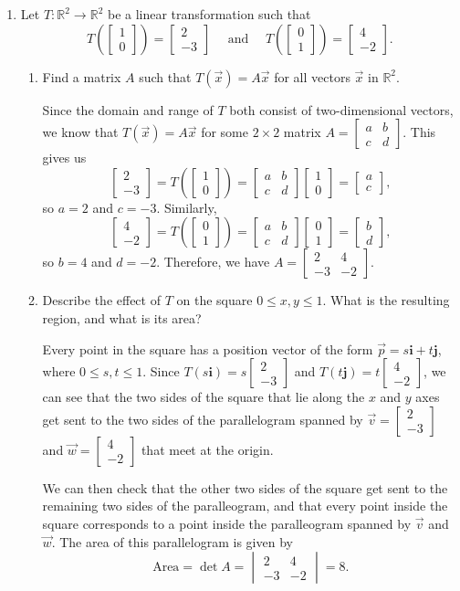 \documentclass[12pt]{article}
\renewcommand{\i}{\mathbf{i}}
\renewcommand{\j}{\mathbf{j}}
\newcommand{\R}{\mathbb{R}}
\newcommand{\bbm}{\begin{bmatrix}}
\newcommand{\ebm}{\end{bmatrix}}
\newcommand{\bvm}{\begin{vmatrix}}
\newcommand{\evm}{\end{vmatrix}}
\begin{document}
\begin{enumerate}
\item Let $T:\R^2\to \R^2$ be a linear transformation such that
\[
 T\left(\bbm 1\\0\ebm\right) = \bbm 2\\-3\ebm \quad\text{ and } \quad T\left(\bbm 0\\1\ebm\right) = \bbm 4\\-2\ebm.
\]
\begin{enumerate}
 \item Find a matrix $A$ such that $T(\vec{x}) = A\vec{x}$ for all vectors $\vec{x}$ in $\R^2$.

\bigskip

Since the domain and range of $T$ both consist of two-dimensional vectors, we know that $T(\vec{x})=A\vec{x}$ for some $2\times 2$ matrix $A=\bbm a&b\\c&d\ebm$. This gives us
\[
 \bbm 2\\-3\ebm = T\left(\bbm 1\\0\ebm\right) = \bbm a&b\\c&d\ebm\bbm 1\\0\ebm = \bbm a\\c\ebm,
\]
so $a=2$ and $c=-3$. Similarly,
\[
 \bbm 4\\-2\ebm = T\left(\bbm 0\\1\ebm\right) = \bbm a&b\\c&d\ebm\bbm 0\\1\ebm = \bbm b\\d\ebm,
\]
so $b=4$ and $d=-2$. Therefore, we have $A=\bbm 2&4\\-3&-2\ebm$.

 \item Describe the effect of $T$ on the square $0\leq x, y\leq 1$. What is the resulting region, and what is its area?

\bigskip

Every point in the square has a position vector of the form $\vec{p}=s\i+t\j$, where $0\leq s,t\leq 1$. Since $T(s\i) = s\bbm 2\\-3\ebm$ and $T(t\j) = t\bbm 4\\-2\ebm$, we can see that the two sides of the square that lie along the $x$ and $y$ axes get sent to the two sides of the parallelogram spanned by $\vec{v} = \bbm 2\\-3\ebm$ and $\vec{w} = \bbm 4\\-2\ebm$ that meet at the origin.

We can then check that the other two sides of the square get sent to the remaining two sides of the paralleogram, and that every point inside the square corresponds to a point inside the paralleogram spanned by $\vec{v}$ and $\vec{w}$. The area of this parallelogram is given by
\[
 \text{Area} = \det A = \bvm 2&4\\-3&-2\evm = 8.
\]

\end{enumerate}
 \end{enumerate}
\end{document}
